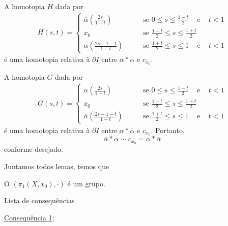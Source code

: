 \begin{dem}
    A homotopia $H$ dada por 
    \begin{align*}
        H(s,t)=\begin{cases}
            \overline{\alpha}(\frac{2s}{1-t})\;\;\;&\;\;\;\mbox{ se }0\le s \le \frac{1-t}{2} \;\;\;\mbox{ e }\;\;\;t<1\\
            x_0 \;\;\;&\;\;\;\mbox{ se } \frac{1-t}{2}\le s\le \frac{1+t}{2}\\
            \alpha(\frac{2s-1-t}{1-t}) \;\;\;&\;\;\;\mbox{ se }\frac{1+t}{2}\le s\le 1 \;\;\;\mbox{ e }\;\;\;t<1
        \end{cases}
    \end{align*}
    é uma homotopia relativa à $\partial I$ entre $\overline{\alpha}*\alpha$ e $c_{x_0}.$
    
    A homotopia $G$ dada por 
    \begin{align*}
        G(s,t)=\begin{cases}
            \alpha(\frac{2s}{1-t})\;\;\;&\;\;\;\mbox{ se }0\le s \le \frac{1-t}{2} \;\;\;\mbox{ e }\;\;\;t<1\\
            x_0 \;\;\;&\;\;\;\mbox{ se } \frac{1-t}{2}\le s\le \frac{1+t}{2}\\
            \overline{\alpha}(\frac{2s-1-t}{1-t}) \;\;\;&\;\;\;\mbox{ se }\frac{1+t}{2}\le s\le 1 \;\;\;\mbox{ e }\;\;\;t<1
        \end{cases}
    \end{align*}
    é uma homotopia relativa à $\partial I$ entre $\alpha*\overline{\alpha}$ e $c_{x_0}.$ Portanto, $$\overline{\alpha}*\alpha\sim c_{x_0}=\alpha*\overline{\alpha}$$ conforme desejado.
\end{dem}

Juntamos todos lemas, temos que 

\begin{thm}
    O $(\pi_1(X,x_0),\cdot)$ é um grupo.
\end{thm}

\begin{titlemize}{Lista de consequências}
	\item \hyperref[grupo-fundamental-def]{Consequência 1};\\ %
\end{titlemize}
